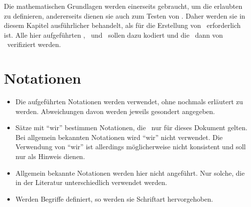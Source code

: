 Die mathematischen Grundlagen werden einerseits gebraucht, um die erlaubten \Beweisschritte{} zu definieren, andererseits dienen sie auch zum Testen von \ASBA.
Daher werden sie in diesem Kapitel ausführlicher behandelt, als für die Erstellung von \ASBA\ erforderlich ist.
Alle hier aufgeführten \Axiome, \Saetze\ und \Beweise\ sollen dazu kodiert und die \Beweise\ dann von \ASBA\ verifiziert werden.

\section{Notationen}%
\label{sec:Notationen}

\begin{itemize}
	\item Die  aufgeführten Notationen werden  verwendet, ohne nochmals erläutert zu werden. Abweichungen davon werden jeweils gesondert angegeben.
	\item Sätze mit \enquote{wir} bestimmen Notationen, die \textevtl\ nur für dieses Dokument gelten.
	Bei allgemein bekannten Notationen wird \enquote{wir} nicht verwendet.
	Die Verwendung von \enquote{wir} ist allerdings möglicherweise nicht konsistent und soll nur als Hinweis dienen.
	\item Allgemein bekannte Notationen werden hier nicht angeführt.
	Nur solche, die in der Literatur unterschiedlich verwendet werden.
	\item Werden Begriffe definiert, so werden sie  Schriftart hervorgehoben.
\end{itemize}
